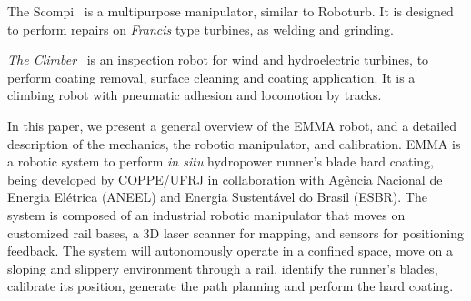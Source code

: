 The Scompi~\cite{scompi} is a multipurpose manipulator, similar to Roboturb. It
is designed to perform repairs on \textit{Francis} type turbines, as welding and
grinding.

\textit{The Climber}~\cite{icm} is an inspection robot for wind and
hydroelectric turbines, to perform coating removal, surface cleaning and
coating application. It is a climbing robot with pneumatic adhesion and
locomotion by tracks.

In this paper, we present a general overview of the EMMA robot, and a detailed
description of the mechanics, the robotic manipulator, and calibration. EMMA is
a robotic system to perform \textit{in situ} hydropower runner's blade hard
coating, being developed by COPPE/UFRJ in collaboration with Agência Nacional
de Energia Elétrica (ANEEL) and Energia Sustentável do Brasil (ESBR). The
system is composed of an industrial robotic manipulator that moves on customized
rail bases, a 3D laser scanner for mapping, and sensors for positioning
feedback. The system will autonomously operate in a confined space, move
on a sloping and slippery environment through a rail, identify the runner's
blades, calibrate its position, generate the path planning and perform the hard
coating. 

\begin{comment}
This text is organized as follows: a general overview of the robot and its main
challenges are presented in Section \ref{sec:general_overview}, detailed
descriptions of the embedded electronics, the vehicle support system, power
supply system, and software architecture are taken in
Sections \ref{sec:electronics_overview}, \ref{sec:powersupply_overview}, and
\ref{sec:software} respectively.
In Section \ref{sec:results}, preliminary results are shown, and concluding
remarks are drawn in Section \ref{sec:conclusions}.
\end{comment}